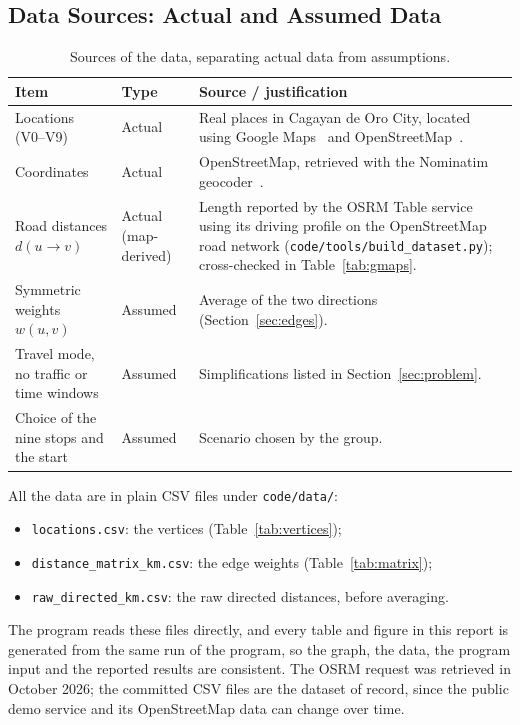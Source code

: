 \subsection{Data Sources: Actual and Assumed Data}\label{sec:data}

\begin{table}[H]
\centering
\caption{Sources of the data, separating actual data from assumptions.}\label{tab:sources}
\vspace{4pt}
\small
\begin{tabularx}{\textwidth}{l l >{\raggedright\arraybackslash}X}
\toprule
\textbf{Item} & \textbf{Type} & \textbf{Source / justification} \\
\midrule
Locations (V0--V9) & Actual & Real places in Cagayan de Oro City, located using Google
Maps~\cite{googlemaps} and OpenStreetMap~\cite{osm}. \\
Coordinates & Actual & OpenStreetMap, retrieved with the Nominatim geocoder~\cite{osm}. \\
Road distances $d(u\to v)$ & Actual (map-derived) & Length reported by the OSRM Table service~\cite{osrmapi}
 using its driving profile on the OpenStreetMap road network (\texttt{code/tools/build\_dataset.py});
 cross-checked in Table~\ref{tab:gmaps}. \\
Symmetric weights $w(u,v)$ & Assumed & Average of the two directions (Section~\ref{sec:edges}). \\
Travel mode, no traffic or time windows & Assumed & Simplifications listed in Section~\ref{sec:problem}. \\
Choice of the nine stops and the start & Assumed & Scenario chosen by the group. \\
\bottomrule
\end{tabularx}
\end{table}

All the data are in plain CSV files under \texttt{code/data/}:
\begin{itemize}
  \item \texttt{locations.csv}: the vertices (Table~\ref{tab:vertices});
  \item \texttt{distance\_matrix\_km.csv}: the edge weights (Table~\ref{tab:matrix});
  \item \texttt{raw\_directed\_km.csv}: the raw directed distances, before averaging.
\end{itemize}
The program reads these files directly, and every table
and figure in this report is generated from the same run of the program, so the graph, the data, the
program input and the reported results are consistent. The OSRM request was retrieved in October 2026;
the committed CSV files are the dataset of record, since the public demo service and its OpenStreetMap
data can change over time.

